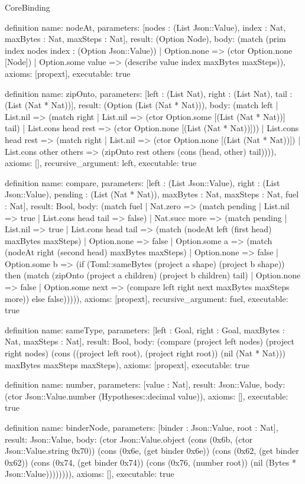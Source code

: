\begin{lexlean}{CoreBinding}
\begin{semanticmodule}
definition{
 name: nodeAt,
 parameters: [nodes : (List Json::Value), index : Nat, maxBytes : Nat, maxSteps : Nat],
 result: (Option Node),
 body: (match (prim index nodes index : (Option Json::Value)) | Option.none => (ctor Option.none [Node]) | Option.some value => (describe value index maxBytes maxSteps)),
 axioms: [propext],
 executable: true
}

definition{
 name: zipOnto,
 parameters: [left : (List Nat), right : (List Nat), tail : (List (Nat * Nat))],
 result: (Option (List (Nat * Nat))),
 body: (match left | List.nil => (match right | List.nil => (ctor Option.some [(List (Nat * Nat))] tail) | List.cons head rest => (ctor Option.none [(List (Nat * Nat))])) | List.cons head rest => (match right | List.nil => (ctor Option.none [(List (Nat * Nat))]) | List.cons other others => (zipOnto rest others (cons (head, other) tail)))),
 axioms: [],
 recursive_argument: left,
 executable: true
}

definition{
 name: compare,
 parameters: [left : (List Json::Value), right : (List Json::Value), pending : (List (Nat * Nat)), maxBytes : Nat, maxSteps : Nat, fuel : Nat],
 result: Bool,
 body: (match fuel | Nat.zero => (match pending | List.nil => true | List.cons head tail => false) | Nat.succ more => (match pending | List.nil => true | List.cons head tail => (match (nodeAt left (first head) maxBytes maxSteps) | Option.none => false | Option.some a => (match (nodeAt right (second head) maxBytes maxSteps) | Option.none => false | Option.some b => (if (Toml::sameBytes (project a shape) (project b shape)) then (match (zipOnto (project a children) (project b children) tail) | Option.none => false | Option.some next => (compare left right next maxBytes maxSteps more)) else false))))),
 axioms: [propext],
 recursive_argument: fuel,
 executable: true
}

definition{
 name: sameType,
 parameters: [left : Goal, right : Goal, maxBytes : Nat, maxSteps : Nat],
 result: Bool,
 body: (compare (project left nodes) (project right nodes) (cons ((project left root), (project right root)) (nil (Nat * Nat))) maxBytes maxSteps maxSteps),
 axioms: [propext],
 executable: true
}

definition{
 name: number,
 parameters: [value : Nat],
 result: Json::Value,
 body: (ctor Json::Value.number (Hypotheses::decimal value)),
 axioms: [],
 executable: true
}

definition{
 name: binderNode,
 parameters: [binder : Json::Value, root : Nat],
 result: Json::Value,
 body: (ctor Json::Value.object (cons (0x6b, (ctor Json::Value.string 0x70)) (cons (0x6e, (get binder 0x6e)) (cons (0x62, (get binder 0x62)) (cons (0x74, (get binder 0x74)) (cons (0x76, (number root)) (nil (Bytes * Json::Value)))))))),
 axioms: [],
 executable: true
}


\end{semanticmodule}
\end{lexlean}
